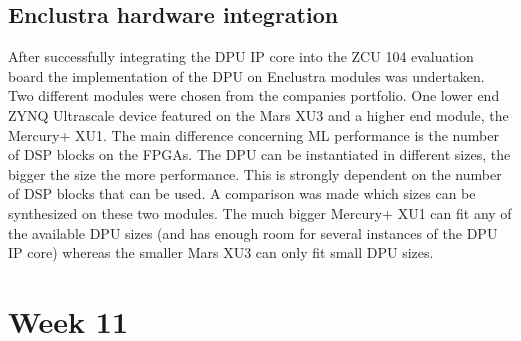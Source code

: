 \subsection{Enclustra hardware integration}
After successfully integrating the \ac{DPU} \ac{IP} core into the ZCU 104 evaluation board the implementation of the \ac{DPU} on Enclustra modules was undertaken. Two different modules were chosen from the companies portfolio. One lower end ZYNQ Ultrascale device featured on the Mars XU3 and a higher end module, the Mercury+ XU1. The main difference concerning \ac{ML} performance is the number of \ac{DSP} blocks on the \acp{FPGA}. The \ac{DPU} can be instantiated in different sizes, the bigger the size the more performance. This is strongly dependent on the number of \ac{DSP} blocks that can be used. A comparison was made which sizes can be synthesized on these two modules. The much bigger Mercury+ XU1 can fit any of the available \ac{DPU} sizes (and has enough room for several instances of the \ac{DPU} \ac{IP} core) whereas the smaller Mars XU3 can only fit small \ac{DPU} sizes.

\section{Week 11}
